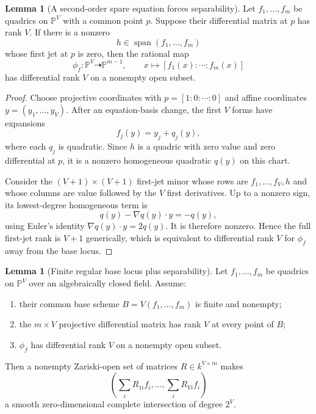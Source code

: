 \documentclass[11pt,a4paper]{article}
\theoremstyle{definition}
\newtheorem{lemma}[theorem]{Lemma}
\theoremstyle{remark}
\newcommand{\PP}{\mathbb P}
\newcommand{\Span}{\operatorname{span}}
\begin{document}
\begin{lemma}[A second-order spare equation forces separability]\label{lem:second-order}
Let $f_1,\ldots,f_m$ be quadrics on $\PP^V$ with a common point $p$.  Suppose their differential matrix at $p$ has rank $V$.  If there is a nonzero
\[
h\in\Span(f_1,\ldots,f_m)
\]
whose first jet at $p$ is zero, then the rational map
\[
\phi_f:\PP^V\dashrightarrow\PP^{m-1},
\qquad
x\longmapsto[f_1(x):\cdots:f_m(x)]
\]
has differential rank $V$ on a nonempty open subset.
\end{lemma}

\begin{proof}
Choose projective coordinates with $p=[1:0:\cdots:0]$ and affine coordinates $y=(y_1,\ldots,y_V)$.  After an equation-basis change, the first $V$ forms have expansions
\[
f_j(y)=y_j+q_j(y),
\]
where each $q_j$ is quadratic.  Since $h$ is a quadric with zero value and zero differential at $p$, it is a nonzero homogeneous quadratic $q(y)$ on this chart.

Consider the $(V+1)\times(V+1)$ first-jet minor whose rows are $f_1,\ldots,f_V,h$ and whose columns are value followed by the $V$ first derivatives.  Up to a nonzero sign, its lowest-degree homogeneous term is
\[
q(y)-\nabla q(y)\cdot y=-q(y),
\]
using Euler's identity $\nabla q(y)\cdot y=2q(y)$.  It is therefore nonzero.  Hence the full first-jet rank is $V+1$ generically, which is equivalent to differential rank $V$ for $\phi_f$ away from the base locus.
\end{proof}

\begin{lemma}[Finite regular base locus plus separability]\label{lem:finite-base-mixing}
Let $f_1,\ldots,f_m$ be quadrics on $\PP^V$ over an algebraically closed field.  Assume:
\begin{enumerate}
\item their common base scheme $B=V(f_1,\ldots,f_m)$ is finite and nonempty;
\item the $m\times V$ projective differential matrix has rank $V$ at every point of $B$;
\item $\phi_f$ has differential rank $V$ on a nonempty open subset.
\end{enumerate}
Then a nonempty Zariski-open set of matrices $R\in k^{V\times m}$ makes
\[
\left(\sum_iR_{1i}f_i,\ldots,\sum_iR_{Vi}f_i\right)
\]
a smooth zero-dimensional complete intersection of degree $2^V$.
\end{lemma}
\end{document}
